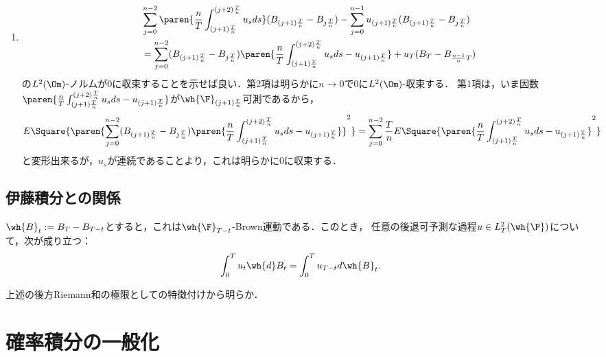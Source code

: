 \documentclass[uplatex,dvipdfmx]{jsreport}
\begin{document}
\begin{Proof}
\begin{enumerate}
        \item 
        \begin{align*}
            &\sum_{j=0}^{n-2}\paren{\frac{n}{T}\int^{(j+2)\frac{T}{n}}_{(j+1)\frac{T}{n}}u_sds}(B_{(j+1)\frac{T}{n}}-B_{j\frac{T}{n}})-\sum_{j=0}^{n-1}u_{(j+1)\frac{T}{n}}(B_{(j+1)\frac{T}{n}}-B_{j\frac{T}{n}})\\
            &=\sum_{j=0}^{n-2}(B_{(j+1)\frac{T}{n}}-B_{j\frac{T}{n}})\paren{\frac{n}{T}\int^{(j+2)\frac{T}{n}}_{(j+1)\frac{T}{n}}u_sds-u_{(j+1)\frac{T}{n}}}+u_T(B_T-B_{\frac{n-1}{n}T})
        \end{align*}
        の$L^2(\Om)$-ノルムが$0$に収束することを示せば良い．第2項は明らかに$n\to0$で$0$に$L^2(\Om)$-収束する．
        第1項は，いま因数$\paren{\frac{n}{T}\int^{(j+2)\frac{T}{n}}_{(j+1)\frac{T}{n}}u_sds-u_{(j+1)\frac{T}{n}}}$が$\wh{\F}_{(j+1)\frac{T}{n}}$可測であるから，
        \begin{align*}
            E\Square{\paren{\sum_{j=0}^{n-2}(B_{(j+1)\frac{T}{n}}-B_{j\frac{T}{n}})\paren{\frac{n}{T}\int^{(j+2)\frac{T}{n}}_{(j+1)\frac{T}{n}}u_sds-u_{(j+1)\frac{T}{n}}}}^2}&=\sum_{j=0}^{n-2}\frac{T}{n}E\Square{\paren{\frac{n}{T}\int^{(j+2)\frac{T}{n}}_{(j+1)\frac{T}{n}}u_sds-u_{(j+1)\frac{T}{n}}}^2}
        \end{align*}
        と変形出来るが，$u_s$が連続であることより，これは明らかに$0$に収束する．
    \end{enumerate}
\end{Proof}
\begin{remarks}[11/30の講究の焦点]
    
\end{remarks}

\subsection{伊藤積分との関係}

\begin{proposition}[伊藤積分との関係]
    $\wh{B}_t:=B_T-B_{T-t}$とすると，これは$\wh{\F}_{T-t}$-Brown運動である．このとき，
    任意の後退可予測な過程$u\in L^2_T(\wh{\P})$について，次が成り立つ：
    \[\int^T_0u_t\wh{d}B_t=\int^T_0u_{T-t}d\wh{B}_t.\]
\end{proposition}
\begin{Proof}
    上述の後方Riemann和の極限としての特徴付けから明らか．
\end{Proof}

\section{確率積分の一般化}
\end{document}
